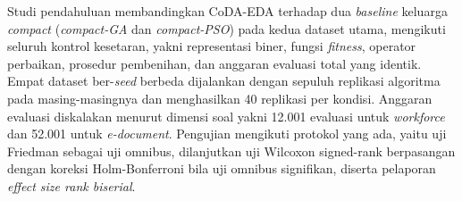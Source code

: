 Studi pendahuluan membandingkan CoDA-EDA terhadap dua \textit{baseline} keluarga \textit{compact} (\textit{compact-GA} dan \textit{compact-PSO}) pada kedua dataset utama, mengikuti seluruh kontrol kesetaran, yakni representasi biner, fungsi \textit{fitness}, operator perbaikan, prosedur pembenihan, dan anggaran evaluasi total yang identik.
Empat dataset ber-\textit{seed} berbeda dijalankan dengan sepuluh replikasi algoritma pada masing-masingnya dan menghasilkan 40 replikasi per kondisi.
Anggaran evaluasi diskalakan menurut dimensi soal yakni 12.001 evaluasi untuk \textit{workforce} dan 52.001 untuk \textit{e-document}.
Pengujian mengikuti protokol yang ada, yaitu uji Friedman sebagai uji omnibus, dilanjutkan uji Wilcoxon signed-rank berpasangan dengan koreksi Holm-Bonferroni bila uji omnibus signifikan, diserta pelaporan \textit{effect size rank biserial}.


